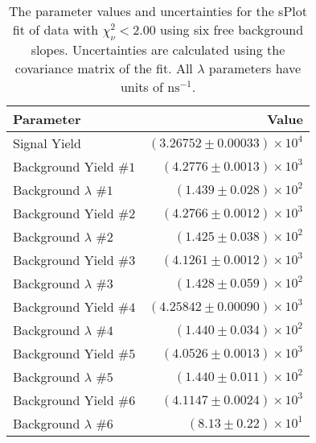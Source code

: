 
\begin{table}[ht]
    \begin{center}
        \begin{tabular}{lr}\toprule
            Parameter & Value \\\midrule
            Signal Yield & $(3.26752 \pm 0.00033) \times 10^{4}$ \\
            Background Yield $\#1$ & $(4.2776 \pm 0.0013) \times 10^{3}$ \\
            Background $\lambda$ $\#1$ & $(1.439 \pm 0.028) \times 10^{2}$ \\
            Background Yield $\#2$ & $(4.2766 \pm 0.0012) \times 10^{3}$ \\
            Background $\lambda$ $\#2$ & $(1.425 \pm 0.038) \times 10^{2}$ \\
            Background Yield $\#3$ & $(4.1261 \pm 0.0012) \times 10^{3}$ \\
            Background $\lambda$ $\#3$ & $(1.428 \pm 0.059) \times 10^{2}$ \\
            Background Yield $\#4$ & $(4.25842 \pm 0.00090) \times 10^{3}$ \\
            Background $\lambda$ $\#4$ & $(1.440 \pm 0.034) \times 10^{2}$ \\
            Background Yield $\#5$ & $(4.0526 \pm 0.0013) \times 10^{3}$ \\
            Background $\lambda$ $\#5$ & $(1.440 \pm 0.011) \times 10^{2}$ \\
            Background Yield $\#6$ & $(4.1147 \pm 0.0024) \times 10^{3}$ \\
            Background $\lambda$ $\#6$ & $(8.13 \pm 0.22) \times 10^{1}$ \\\bottomrule
        \end{tabular}
        \caption{The parameter values and uncertainties for the sPlot fit of data with $\chi^2_\nu < 2.00$ using six free background slopes. Uncertainties are calculated using the covariance matrix of the fit. All $\lambda$ parameters have units of $\si{\nano\second}^{-1}$.}\label{tab:splot-fit-results-chisqdof-2.00-free-6}
    \end{center}
\end{table}
